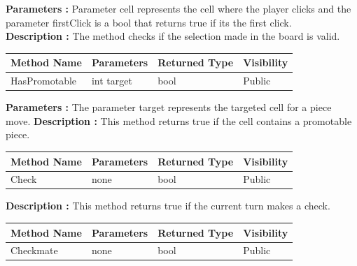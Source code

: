 \documentclass[12pt]{article}
\begin{document}
\textbf{Parameters :} Parameter cell represents the cell
where the player clicks and the parameter firstClick is a bool
that returns true if its the first click.
\\

\textbf{Description :} The method checks if the selection made
in the board is valid.

\begin{table}[H]
    \begin{tabular}{|l|l|l|l|}
    \hline
    \rowcolor[HTML]{EFEFEF} 
    \cellcolor[HTML]{EFEFEF}\textbf{Method Name} & \textbf{Parameters}     & \textbf{Returned Type} & \textbf{Visibility} \\ \hline
    HasPromotable                                & int target                    & bool                   & Public              \\ \hline
    \end{tabular}
\end{table}


\textbf{Parameters :} The parameter target represents the targeted cell for a piece move.
\textbf{Description :} This method returns true if the cell contains a promotable piece.

\begin{table}[H]
    \begin{tabular}{|l|l|l|l|}
    \hline
    \rowcolor[HTML]{EFEFEF} 
    \cellcolor[HTML]{EFEFEF}\textbf{Method Name} & \textbf{Parameters}     & \textbf{Returned Type} & \textbf{Visibility} \\ \hline
    Check                                        & none                    & bool                   & Public              \\ \hline
    \end{tabular}
\end{table}

\textbf{Description :} This method returns true if the current turn makes a check.

\begin{table}[H]
    \begin{tabular}{|l|l|l|l|}
    \hline
    \rowcolor[HTML]{EFEFEF} 
    \cellcolor[HTML]{EFEFEF}\textbf{Method Name} & \textbf{Parameters}     & \textbf{Returned Type} & \textbf{Visibility} \\ \hline
    Checkmate                                        & none                    & bool                   & Public              \\ \hline
    \end{tabular}
\end{table}
\end{document}
